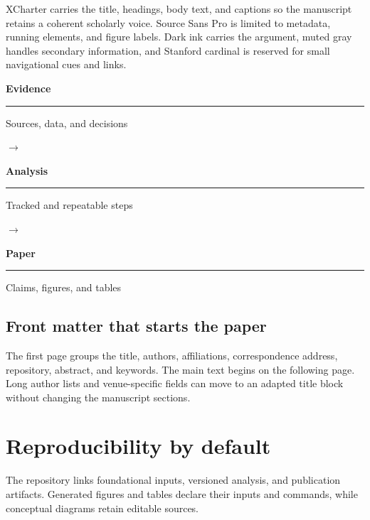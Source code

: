 \documentclass[11pt]{article}
\newcommand{\previewstage}[2]{%
  \begin{minipage}[c][0.78in][c]{0.225\textwidth}
    \centering
    {\sffamily\bfseries\color{paperink}#1\par}
    \vspace{0.18em}
    {\color{paperrule}\rule{0.82\linewidth}{0.5pt}\par}
    \vspace{0.20em}
    {\sffamily\footnotesize\color{papermuted}#2\par}
  \end{minipage}%
}
\newcommand{\previewarrow}{\textcolor{paperaccent}{\large$\longrightarrow$}}
\begin{document}
XCharter carries the title, headings, body text, and captions so the manuscript retains a coherent scholarly voice.
Source Sans Pro is limited to metadata, running elements, and figure labels.
Dark ink carries the argument, muted gray handles secondary information, and Stanford cardinal is reserved for small navigational cues and links.

\begin{center}
  \begin{minipage}{\textwidth}
    \centering
    \previewstage{Evidence}{Sources, data, and decisions}
    \hfill\previewarrow\hfill
    \previewstage{Analysis}{Tracked and repeatable steps}
    \hfill\previewarrow\hfill
    \previewstage{Paper}{Claims, figures, and tables}
    \captionsetup{hypcap=false}
    \label{fig:preview-workflow}
  \end{minipage}
\end{center}

\subsection{Front matter that starts the paper}

The first page groups the title, authors, affiliations, correspondence address, repository, abstract, and keywords.
The main text begins on the following page.
Long author lists and venue-specific fields can move to an adapted title block without changing the manuscript sections.

\section{Reproducibility by default}

The repository links foundational inputs, versioned analysis, and publication artifacts.
Generated figures and tables declare their inputs and commands, while conceptual diagrams retain editable sources.
\end{document}
